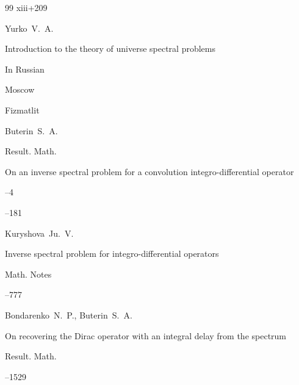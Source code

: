 \begin{thebibliography}{99}
\totalpages xiii+209 







\by Yurko~V.~A.

\book Introduction to the theory of universe spectral problems

\lang In Russian


\publaddr Moscow

\publ Fizmatlit 






\by Buterin~S.~A.

\jour Result. Math. 




\paper On an inverse spectral problem for a convolution integro-differential operator

--4

–181




\by Kuryshova~Ju.~V. 

\paper  Inverse spectral problem for integro-differential operators

\jour Math. Notes





–777




\by Bondarenko~N.~P., Buterin~S.~A.

\paper On recovering the Dirac operator with an integral delay from the spectrum

\jour Result. Math. 





–1529




\end{thebibliography}
